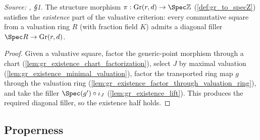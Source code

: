 \begin{lemma}\leanok
  \label{lem:gr_valuativeExistence_toSpecZ}
  \textit{Source: \cite{nitsure-hilbert-quot}, \S 1.}
  The structure morphism \(\pi : \mathrm{Gr}(r,d) \to \Spec \mathbb{Z}\)
  (\cref{def:gr_to_specZ}) satisfies the \emph{existence} part of the valuative
  criterion: every commutative square from a valuation ring \(R\) (with fraction
  field \(K\)) admits a diagonal filler \(\Spec R \to \mathrm{Gr}(r,d)\).
\end{lemma}
\begin{proof}
    \leanok
  Given a valuative square, factor the generic-point morphism through a chart
  (\cref{lem:gr_existence_chart_factorization}), select \(J\) by maximal valuation
  (\cref{lem:gr_existence_minimal_valuation}), factor the transported ring map
  \(g\) through the valuation ring (\cref{lem:gr_existence_factor_through_valuation_ring}),
  and take the filler \(\Spec(g') \circ \iota_J\)
  (\cref{lem:gr_existence_lift}). This produces the required diagonal filler, so the
  existence half holds.
\end{proof}

\subsection*{Properness}

